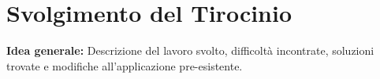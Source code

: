 \chapter{Svolgimento del Tirocinio}

\textbf{Idea generale:} Descrizione del lavoro svolto, difficoltà incontrate, soluzioni trovate e modifiche all'applicazione pre-esistente. 